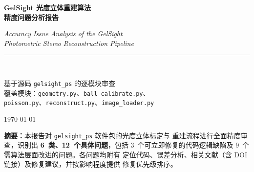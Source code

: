 \usepackage{fancyhdr}
\pagestyle{fancy}
\fancyhf{}
\cfoot{\thepage}
\renewcommand{\headrulewidth}{0.4pt}

\usepackage{enumitem}

\usepackage{setspace}
\onehalfspacing



\begin{titlepage}
  \centering
  \vspace*{1.8cm}
  {\LARGE\bfseries GelSight 光度立体重建算法\\[0.5em]精度问题分析报告\par}
  \vspace{0.5em}
  {\large\itshape Accuracy Issue Analysis of the GelSight\\[0.2em]
   Photometric Stereo Reconstruction Pipeline\par}
  \vspace{1.8em}
  \rule{0.55\linewidth}{0.5pt}\\[1em]
  {\normalsize
    基于源码 \texttt{gelsight\_ps} 的逐模块审查\\[0.4em]
    覆盖模块：\texttt{geometry.py}、\texttt{ball\_calibrate.py}、\\[0.2em]
    \texttt{poisson.py}、\texttt{reconstruct.py}、\texttt{image\_loader.py}
  \par}
  \vspace{1.8em}
  {\normalsize\today}
  \vfill
  \begin{mdframed}[
    backgroundcolor = gray!7,
    linecolor       = gray!45,
    linewidth       = 0.6pt,
    roundcorner     = 4pt,
    innerleftmargin = 12pt, innerrightmargin = 12pt,
    innertopmargin  = 10pt, innerbottommargin = 10pt,
  ]
    \small\textbf{摘要：}本报告对 \texttt{gelsight\_ps} 软件包的光度立体标定与
    重建流程进行全面精度审查，识别出 \textbf{6~类、12~个具体问题}，包括
    3~个可立即修复的代码逻辑缺陷及 9~个需算法层面改进的问题。各问题均附有
    定位代码、误差分析、相关文献（含 DOI 链接）及修复建议，并按影响程度提供
    修复优先级排序。
  \end{mdframed}
\end{titlepage}

